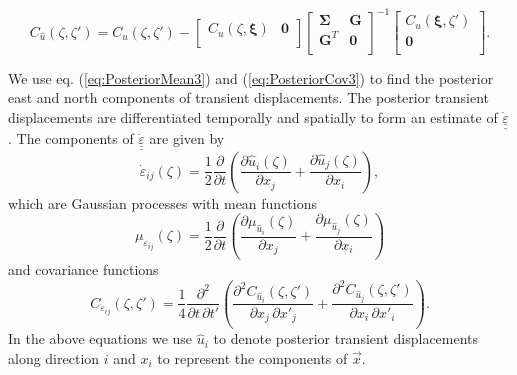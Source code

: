 \documentclass[10pt,letter]{article}
\newcommand*{\du}[1]{\underline{\underline{#1}}}
\begin{document}
\begin{equation}\label{eq:PosteriorCov3}
C_{\hat{u}}(\zeta,\zeta') = C_u(\zeta,\zeta') - 
                    \left[\begin{array}{cc}
                          C_u(\zeta,\bm{\xi}) & \bm{0} \\
                          \end{array}\right]
                    \left[\begin{array}{cc}
                          \bm{\Sigma} & \bm{G} \\
                          \bm{G}^T  & \bm{0} \\
                          \end{array}\right]^{-1}
                    \left[\begin{array}{c}
                          C_u(\bm{\xi},\zeta') \\
                          \bm{0} \\
                          \end{array}\right].
\end{equation}

We use eq. (\ref{eq:PosteriorMean3}) and (\ref{eq:PosteriorCov3}) to find the posterior east and north components of transient displacements. The posterior transient displacements are differentiated temporally and spatially to form an estimate of $\dot{\du{\varepsilon}}$. The components of $\dot{\du{\varepsilon}}$ are given by 
\begin{equation}\label{eq:StrainRate}
\dot{\varepsilon}_{ij}(\zeta) = \frac{1}{2} \frac{\partial}{\partial t} \left(
                                        \frac{\partial \hat{u}_i(\zeta)}{\partial x_j} +  
                                        \frac{\partial \hat{u}_j(\zeta)}{\partial x_i}\right),
\end{equation}
which are Gaussian processes with mean functions
\begin{equation}\label{eq:StrainMean}
\mu_{\dot{\varepsilon}_{ij}}(\zeta) = \frac{1}{2}\frac{\partial}{\partial t}\left(
                                  \frac{\partial \mu_{\hat{u}_i}(\zeta)}{\partial x_j} + 
                                  \frac{\partial \mu_{\hat{u}_j}(\zeta)}{\partial x_i} \right)
\end{equation} 
and covariance functions
\begin{equation}\label{eq:StrainCov}
C_{\dot{\varepsilon}_{ij}}(\zeta,\zeta') = \frac{1}{4} \frac{\partial^2}{\partial t \, \partial t'}\left(
                                   \frac{\partial^2 C_{\hat{u}_i}(\zeta,\zeta')}{\partial x_j \, \partial x'_j} + 
                                   \frac{\partial^2 C_{\hat{u}_j}(\zeta,\zeta')}{\partial x_i \, \partial x'_i} \right).
\end{equation} 
In the above equations we use $\hat{u}_i$ to denote posterior transient displacements along direction $i$ and $x_i$ to represent the components of $\vec{x}$.
\end{document}
